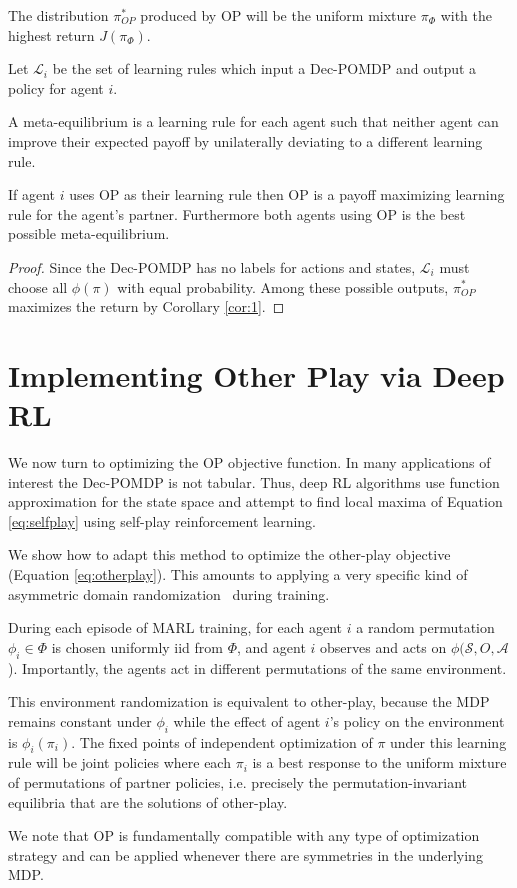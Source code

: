 \begin{corollary}
The distribution $\pi^*_{OP}$ produced by OP will be the uniform mixture $\pi_\Phi$ with the highest return $J(\pi_\Phi)$.
\label{cor:1}
\end{corollary}

Let $\mathcal{L}_i$ be the set of learning rules which input a Dec-POMDP and output a policy for agent $i$. 

A meta-equilibrium is a learning rule for each agent such that neither agent can improve their expected payoff by unilaterally deviating to a different learning rule.

\begin{prop}
If agent $i$ uses OP as their learning rule then OP is a payoff maximizing learning rule for the agent's partner. Furthermore both agents using OP is the best possible meta-equilibrium.
\end{prop}

\begin{proof}
Since the Dec-POMDP has no labels for actions and states, $\mathcal{L}_i$ must choose all $\phi(\pi)$ with equal probability. Among these possible outputs, $\pi^*_{OP}$ maximizes the return by Corollary \ref{cor:1}.
\end{proof}

\section{Implementing Other Play via Deep RL}
We now turn to optimizing the OP objective function. In many applications of interest the Dec-POMDP is not tabular. Thus, deep RL algorithms use function approximation for the state space and attempt to find local maxima of Equation \ref{eq:selfplay} using self-play reinforcement learning. 

We show how to adapt this method to optimize the other-play objective (Equation \ref{eq:otherplay}). This amounts to applying a very specific kind of asymmetric domain randomization~\cite{tobin2017domain} during training.

During each episode of MARL training, for each agent $i$ a random permutation $\phi_i \in \Phi$ is chosen uniformly iid from $ \Phi$, and agent $i$ observes and acts on $\phi(\mathcal{S}, O, \mathcal{A}$). Importantly, the agents act in different permutations of the same environment.

This environment randomization is equivalent to other-play, because the MDP remains constant under $\phi_i$ while the effect of agent $i$'s policy on the environment is $\phi_i(\pi_i)$. The fixed points of independent optimization of $\pi$ under this learning rule will be joint policies where each $\pi_i$ is a best response to the uniform mixture of permutations of partner policies, i.e. precisely the permutation-invariant equilibria that are the solutions of other-play.

We note that OP is fundamentally compatible with any type of optimization strategy and can be applied whenever there are symmetries in the underlying MDP.
